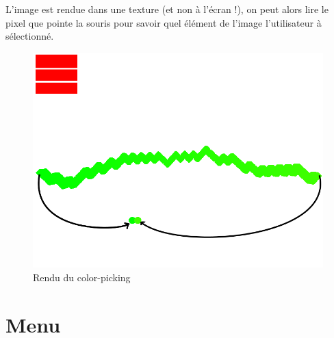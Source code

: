 L'image est rendue dans une texture (et non à l'écran !), on peut alors lire le pixel que pointe la souris pour savoir quel élément de l'image l'utilisateur à sélectionné.

\begin{figure}[h]
 \centering
 \includegraphics[scale=0.3,keepaspectratio=true]{img/colorpick.png}
 \caption{Rendu du color-picking}
 \label{colorPick}
\end{figure}

\section{Menu}
